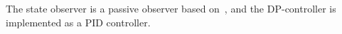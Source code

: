 \documentclass[journal]{IEEEtran}
\newcommand{\vect}[1]{\boldsymbol{#1}}
\newcommand{\tr}{^\intercal}
\begin{document}
The state observer is a passive observer based on~\cite{Fossen19993}, and the DP-controller is implemented as a PID controller.
%
%
%
%
\end{document}

